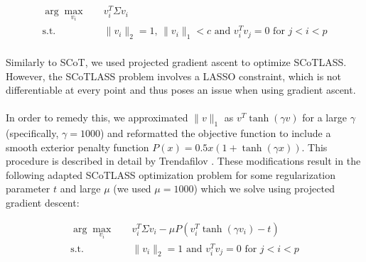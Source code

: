 \documentclass[11pt,letterpaper]{report}
\begin{document}
\begin{equation*}
\begin{aligned}
\arg\max_{v_{i}} \quad & v_{i}^{T}\Sigma v_{i}\\
\textrm{s.t.} \quad & \lVert v_{i} \rVert_{2} = 1 \text{, }
            \lVert v_{i} \rVert_{1} < c \text{ and } v_{i}^{T} v_{j} = 0 \text{ for }  j < i < p \\
\end{aligned}
\end{equation*}

Similarly to SCoT, we used projected gradient ascent to optimize SCoTLASS. However, the SCoTLASS problem involves a LASSO constraint, which is not differentiable at every point and thus poses an issue when using gradient ascent.\\
\\
In order to remedy this, we approximated $\lVert v\rVert_{1}$ as $v^T\tanh{(\gamma v)}$ for a large $\gamma$ (specifically, $\gamma = 1000$) and reformatted the objective function to include a smooth exterior penalty function $P(x) = 0.5x(1+\tanh{(\gamma x)})$. This procedure is described in detail by Trendafilov \citeyear{Trendafilov2004}. These modifications result in the following adapted SCoTLASS optimization problem for some regularization parameter $t$ and large $\mu$ (we used $\mu = 1000$) which we solve using projected gradient descent:

\begin{equation*}
\begin{aligned}
\arg\max_{v_{i}} \quad & v_{i}^{T}\Sigma v_{i} - \mu P(v_{i}^T \tanh{(\gamma v_{i})} - t)\\
\textrm{s.t.} \quad & \lVert v_{i} \rVert_{2} = 1 \text { and } v_{i}^{T}v_{j} = 0 \text{ for }  j < i < p \\
\end{aligned}
\end{equation*}
\end{document}
